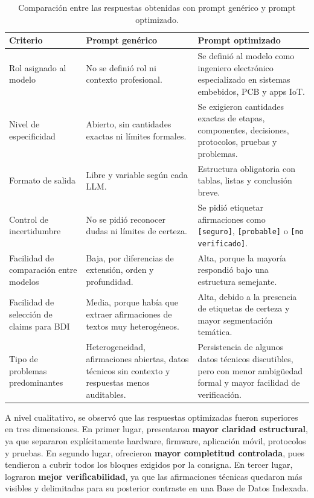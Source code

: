 \documentclass[11pt,a4paper]{article}
\begin{document}
\begin{table}[h]
\centering
\scriptsize
\setlength{\tabcolsep}{4pt}
\renewcommand{\arraystretch}{1.08}
\begin{tabular}{|P{2.7cm}|P{4.6cm}|P{4.6cm}|}
\hline
\textbf{Criterio} & \textbf{Prompt genérico} & \textbf{Prompt optimizado} \\
\hline
Rol asignado al modelo & No se definió rol ni contexto profesional. & Se definió al modelo como ingeniero electrónico especializado en sistemas embebidos, PCB y apps IoT. \\
\hline
Nivel de especificidad & Abierto, sin cantidades exactas ni límites formales. & Se exigieron cantidades exactas de etapas, componentes, decisiones, protocolos, pruebas y problemas. \\
\hline
Formato de salida & Libre y variable según cada LLM. & Estructura obligatoria con tablas, listas y conclusión breve. \\
\hline
Control de incertidumbre & No se pidió reconocer dudas ni límites de certeza. & Se pidió etiquetar afirmaciones como \texttt{[seguro]}, \texttt{[probable]} o \texttt{[no verificado]}. \\
\hline
Facilidad de comparación entre modelos & Baja, por diferencias de extensión, orden y profundidad. & Alta, porque la mayoría respondió bajo una estructura semejante. \\
\hline
Facilidad de selección de claims para BDI & Media, porque había que extraer afirmaciones de textos muy heterogéneos. & Alta, debido a la presencia de etiquetas de certeza y mayor segmentación temática. \\
\hline
Tipo de problemas predominantes & Heterogeneidad, afirmaciones abiertas, datos técnicos sin contexto y respuestas menos auditables. & Persistencia de algunos datos técnicos discutibles, pero con menor ambigüedad formal y mayor facilidad de verificación. \\
\hline
\end{tabular}
\caption{Comparación entre las respuestas obtenidas con prompt genérico y prompt optimizado.}
\label{tab:comparacion_etapa2}
\end{table}
\setlength{\tabcolsep}{6pt}
\normalsize

A nivel cualitativo, se observó que las respuestas optimizadas fueron superiores en tres dimensiones. En primer lugar, presentaron \textbf{mayor claridad estructural}, ya que separaron explícitamente hardware, firmware, aplicación móvil, protocolos y pruebas. En segundo lugar, ofrecieron \textbf{mayor completitud controlada}, pues tendieron a cubrir todos los bloques exigidos por la consigna. En tercer lugar, lograron \textbf{mejor verificabilidad}, ya que las afirmaciones técnicas quedaron más visibles y delimitadas para su posterior contraste en una Base de Datos Indexada.
\end{document}
